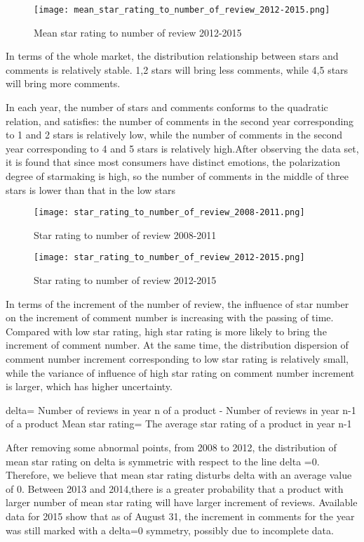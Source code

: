 \documentclass{mcmthesis}
\begin{document}
\begin{figure}[!h]
  \small
  \centering
  \texttt{[image: mean\_star\_rating\_to\_number\_of\_review\_2012-2015.png]}
  \caption{Mean star rating to number of review 2012-2015} %
\end{figure}

In terms of the whole market, the distribution relationship between stars and comments is relatively stable. 1,2 stars will bring less comments, while 4,5 stars will bring more comments.

In each year, the number of stars and comments conforms to the quadratic relation, and satisfies: the number of comments in the second year corresponding to 1 and 2 stars is relatively low, while the number of comments in the second year corresponding to 4 and 5 stars is relatively high.After observing the data set, it is found that since most consumers have distinct emotions, the polarization degree of starmaking is high, so the number of comments in the middle of three stars is lower than that in the low stars

\begin{figure}[!h]
  \small
  \centering
  \texttt{[image: star\_rating\_to\_number\_of\_review\_2008-2011.png]}
  \caption{Star rating to number of review 2008-2011} %
\end{figure}

\begin{figure}[!h]
  \small
  \centering
  \texttt{[image: star\_rating\_to\_number\_of\_review\_2012-2015.png]}
  \caption{Star rating to number of review 2012-2015} %
\end{figure}


In terms of the increment of the number of review, the influence of star number on the increment of comment number is increasing with the passing of time. Compared with low star rating, high star rating is more likely to bring the increment of comment number. At the same time, the distribution dispersion of comment number increment corresponding to low star rating is relatively small, while the variance of influence of high star rating on comment number increment is larger, which has higher uncertainty.

delta= Number of reviews in year n of a product - Number of reviews in year n-1 of a product
Mean star rating= The average star rating of a product in year n-1

After removing some abnormal points, from 2008 to 2012, the distribution of mean star rating on delta is symmetric with respect to the line delta =0. Therefore, we believe that mean star rating disturbs delta with an average value of 0. Between 2013 and 2014,there is a greater probability that a product with larger number of mean star rating will have larger increment of reviews. Available data for 2015 show that as of August 31, the increment in comments for the year was still marked with a delta=0 symmetry, possibly due to incomplete data.
\end{document}

